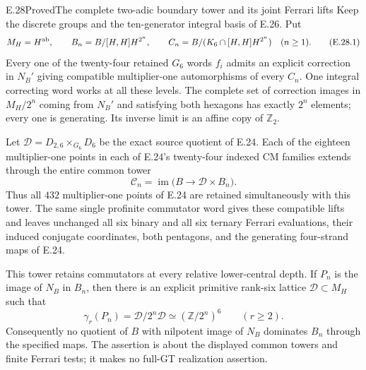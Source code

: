 \begin{statement}{E.28}{Proved}{The complete two-adic boundary tower and its joint Ferrari lifts}
Keep the discrete groups and the ten-generator integral basis of E.26.
Put
\[
 M_H=H^{\rm ab},\qquad
 B_n=B/[H,H]H^{2^n},\qquad
 C_n=B/(K_6\cap[H,H]H^{2^n})\quad(n\ge1).
 \tag{E.28.1}
\]
Every one of the twenty-four retained $G_6$ words $f_i$ admits an
explicit correction in $N_B'$ giving compatible multiplier-one
automorphisms of every $C_n$.  One integral correcting word works
at all these levels.  The complete set of correction images in
$M_H/2^n$ coming from $N_B'$ and satisfying both hexagons has
exactly $2^n$ elements; every one is generating.  Its inverse
limit is an affine copy of $\mathbb Z_2$.

Let $\mathscr D=D_{2,6}\times_{G_6}D_6$ be the exact source
quotient of E.24.  Each of the eighteen multiplier-one points
in each of E.24's twenty-four indexed CM families extends
through the entire common tower
\[
 \mathscr C_n=\operatorname{im}
       \bigl(B\longrightarrow\mathscr D\times B_n\bigr).
 \tag{E.28.2}
\]
Thus all $432$ multiplier-one points of E.24 are retained
simultaneously with this tower.  The same single profinite
commutator word gives these compatible lifts and leaves unchanged
all six binary and all six ternary Ferrari evaluations, their
induced conjugate coordinates, both pentagons, and the generating
four-strand maps of E.24.

This tower retains commutators at every relative lower-central
depth.  If $P_n$ is the image of $N_B$ in $B_n$, then there is an
explicit primitive rank-six lattice $\mathcal D\subset M_H$ such
that
\[
 \gamma_r(P_n)=\mathcal D/2^n\mathcal D
            \simeq(\mathbb Z/2^n)^6
       \qquad(r\ge2).
 \tag{E.28.3}
\]
Consequently no quotient of $B$ with nilpotent image of $N_B$
dominates $B_n$ through the specified maps.  The assertion is
about the displayed common towers and finite Ferrari tests;
it makes no full-GT realization assertion.
\end{statement}
